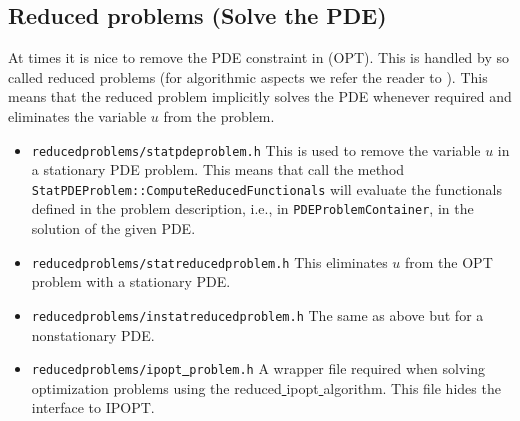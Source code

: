\subsection{Reduced problems (Solve the PDE)}
At times it is nice to remove the PDE constraint in (OPT). 
This is handled by so called reduced 
problems (for algorithmic aspects we refer the reader to 
\cite{BeMeVe06}). 
This means that the reduced problem implicitly solves the PDE whenever required
and eliminates the variable $u$ from the problem.
\begin{itemize}
\item \texttt{reducedproblems/statpdeproblem.h} This is used to remove the variable $u$ in 
  a stationary PDE problem. This means that call the method \\
  \texttt{StatPDEProblem::ComputeReducedFunctionals} will evaluate the functionals 
  defined in the problem description, i.e., in \texttt{PDEProblemContainer}, in the 
  solution of the given PDE.
\item \texttt{reducedproblems/statreducedproblem.h} This eliminates $u$ from the OPT
  problem with a stationary PDE.
\item \texttt{reducedproblems/instatreducedproblem.h} The same as above but for a
  nonstationary PDE.
\item \texttt{reducedproblems/ipopt\underline{ }problem.h} A wrapper file 
 required when solving optimization problems using the 
  reduced\underline{ }ipopt\underline{ }algorithm. This file
  hides the interface to IPOPT.
\end{itemize}

